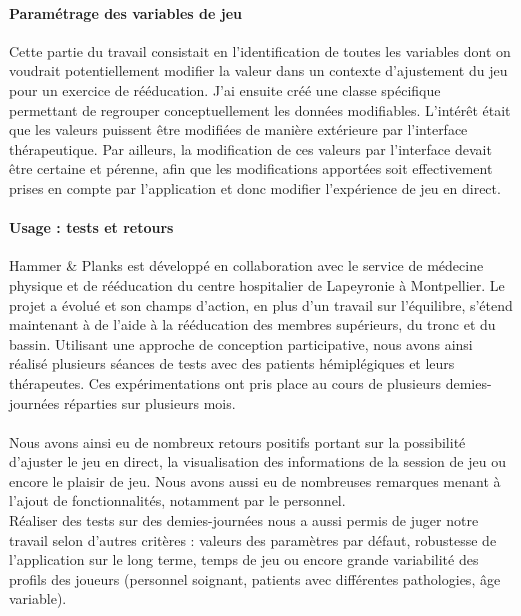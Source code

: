 \documentclass[french, 12pt]{article} %
\begin{document}
\paragraph{Paramétrage des variables de jeu}
Cette partie du travail consistait en l'identification de toutes les variables dont on voudrait potentiellement modifier la valeur dans un contexte d'ajustement du jeu pour un exercice de rééducation. J'ai ensuite créé une classe spécifique permettant de regrouper conceptuellement les données modifiables. L'intérêt était que les valeurs puissent être modifiées de manière extérieure par l'interface thérapeutique. Par ailleurs, la modification de ces valeurs par l'interface devait être certaine et pérenne, afin que les modifications apportées soit effectivement prises en compte par l'application et donc modifier l'expérience de jeu en direct.

\paragraph{Usage : tests et retours\\}
Hammer \& Planks est développé en collaboration avec le service de médecine physique et de rééducation du centre hospitalier de Lapeyronie à Montpellier. Le projet a évolué et son champs d'action, en plus d'un travail sur l'équilibre, s'étend maintenant à de l'aide à la rééducation des membres supérieurs, du tronc et du bassin. Utilisant une approche de conception participative, nous avons ainsi réalisé plusieurs séances de tests avec des patients hémiplégiques et leurs thérapeutes. Ces expérimentations ont pris place au cours de plusieurs demies-journées réparties sur plusieurs mois. 

\paragraph{}
Nous avons ainsi eu de nombreux retours positifs portant sur la possibilité d'ajuster le jeu en direct, la visualisation des informations de la session de jeu ou encore le plaisir de jeu. Nous avons aussi eu de nombreuses remarques menant à l'ajout de fonctionnalités, notamment par le personnel. \\
Réaliser des tests sur des demies-journées nous a aussi permis de juger notre travail selon d'autres critères : valeurs des paramètres par défaut, robustesse de l'application sur le long terme, temps de jeu ou encore grande variabilité des profils des joueurs (personnel soignant, patients avec différentes pathologies, âge variable).
\end{document}
